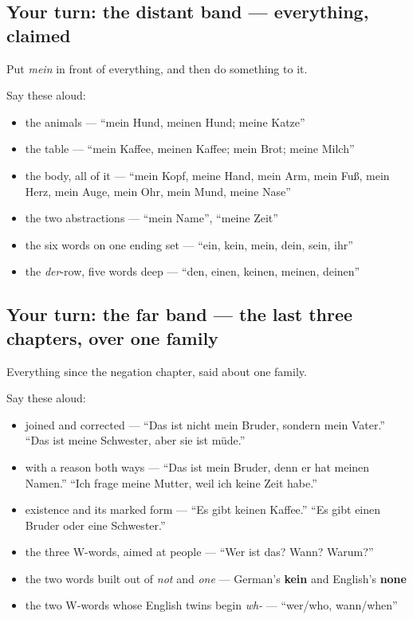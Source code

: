 \subsection*{Your turn: the distant band — everything, claimed}
Put \emph{mein} in front of everything, and then do something to it.

Say these aloud:

\begin{itemize}
\raggedright
  \item the animals — \textquotedblleft{}mein Hund, meinen Hund; meine Katze\textquotedblright{}
  \item the table — \textquotedblleft{}mein Kaffee, meinen Kaffee; mein Brot; meine Milch\textquotedblright{}
  \item the body, all of it — \textquotedblleft{}mein Kopf, meine Hand, mein Arm, mein Fuß, mein Herz, mein Auge, mein Ohr, mein Mund, meine Nase\textquotedblright{}
  \item the two abstractions — \textquotedblleft{}mein Name\textquotedblright{}, \textquotedblleft{}meine Zeit\textquotedblright{}
  \item the six words on one ending set — \textquotedblleft{}ein, kein, mein, dein, sein, ihr\textquotedblright{}
  \item the \emph{der}-row, five words deep — \textquotedblleft{}den, einen, keinen, meinen, deinen\textquotedblright{}
\end{itemize}

\subsection*{Your turn: the far band — the last three chapters, over one family}
Everything since the negation chapter, said about one family.

Say these aloud:

\begin{itemize}
\raggedright
  \item joined and corrected — \textquotedblleft{}Das ist nicht mein Bruder, sondern mein Vater.\textquotedblright{} \textquotedblleft{}Das ist meine Schwester, aber sie ist müde.\textquotedblright{}
  \item with a reason both ways — \textquotedblleft{}Das ist mein Bruder, denn er hat meinen Namen.\textquotedblright{} \textquotedblleft{}Ich frage meine Mutter, weil ich keine Zeit habe.\textquotedblright{}
  \item existence and its marked form — \textquotedblleft{}Es gibt keinen Kaffee.\textquotedblright{} \textquotedblleft{}Es gibt einen Bruder oder eine Schwester.\textquotedblright{}
  \item the three W-words, aimed at people — \textquotedblleft{}Wer ist das? Wann? Warum?\textquotedblright{}
  \item the two words built out of \emph{not} and \emph{one} — German's \textbf{kein} and English's \textbf{none}
  \item the two W-words whose English twins begin \emph{wh-} — \textquotedblleft{}wer/who, wann/when\textquotedblright{}
\end{itemize}

